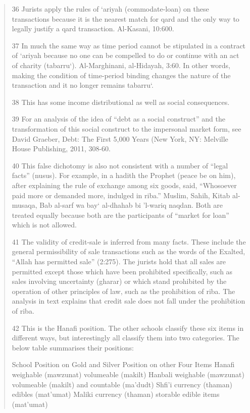 \begin{quote}
36 Jurists apply the rules of ‘ariyah (commodate-loan) on these transactions because it is the nearest match for qard and the only way to legally justify a qard transaction. Al-Kasani, 10:600.

37 In much the same way as time period cannot be stipulated in a contract of ‘ariyah because no one can be compelled to do or continue with an act of charity (tabarru‘). Al-Marghinani, al-Hidayah, 3:60. In other words, making the condition of time-period binding changes the nature of the transaction and it no longer remains tabarru‘.

38 This has some income distributional as well as social consequences.

39 For an analysis of the idea of “debt as a social construct” and the transformation of this social construct to the impersonal market form, see David Graeber, Debt: The First 5,000 Years (New York, NY: Melville House Publishing, 2011, 308-60.

40 This false dichotomy is also not consistent with a number of “legal facts” (nusus). For example, in a hadith the Prophet (peace be on him), after explaining the rule of exchange among six goods, said, “Whosoever paid more or demanded more, indulged in riba.” Muslim, Sahih, Kitab al-musaqa, Bab al-sarf wa bay‘ al-dhahab bi 'l-wariq naqdan. Both are treated equally because both are the participants of “market for loan” which is not allowed.

41 The validity of credit-sale is inferred from many facts. These include the general permissibility of sale transactions such as the words of the Exalted, “Allah has permitted sale” (2:275). The jurists hold that all sales are permitted except those which have been prohibited specifically, such as sales involving uncertainty (gharar) or which stand prohibited by the operation of other principles of law, such as the prohibition of riba. The analysis in text explains that credit sale does not fall under the prohibition of riba.

42 This is the Hanafi position. The other schools classify these six items in different ways, but interestingly all classify them into two categories. The below table summarises their positions:

School Position on Gold and Silver Position on other Four Items Hanafi weighable (mawzunat) volumeable (makilt) Hanbali weighable (mawzunat) volumeable (makilt) and countable (ma'dudt) Shfi'i currency (thaman) edibles (mat'umat) Maliki currency (thaman) storable edible items (mat'umat)


\end{quote}
